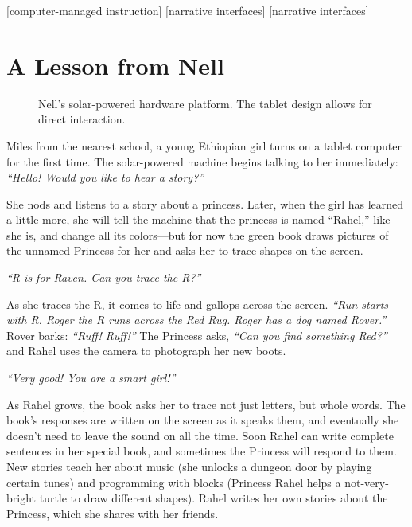 \documentclass{acm_proc_article-sp}
\begin{document}
[computer-managed instruction]
[narrative interfaces]
[narrative interfaces]


\section{A Lesson from Nell}
\begin{figure}
\centering
{}
\caption{Nell's solar-powered hardware platform.  The tablet design
  allows for direct interaction.}\label{fig:xo3}
\end{figure}
Miles from the nearest school, a young Ethiopian girl turns on a
tablet computer for the first time.  The solar-powered machine begins
talking to her immediately: \textit{``Hello!  Would you like to hear a story?''}

She nods and listens to a story about a princess.  Later, when
the girl has learned a little more, she will tell the machine that the
princess is named ``Rahel,'' like she is, and change all its
colors---but for now the green book draws pictures of the unnamed Princess
for her and asks her to trace shapes on the screen.

\textit{``R is for Raven.  Can you trace the R?''}

As she traces the R, it comes to life and gallops across the screen.
\textit{``Run starts with R.  Roger the R runs across the Red Rug.  Roger has a
dog named Rover.''}  Rover barks: \textit{``Ruff! Ruff!''}  The Princess asks,
\textit{``Can you find something Red?''} and Rahel uses the camera to
photograph her new boots.

\textit{``Very good!  You are a smart girl!''}

As Rahel grows, the book asks her to trace not just letters, but whole
words.  The book's responses are written on the screen as it speaks
them, and eventually she doesn't need to leave the sound on all the
time.  Soon Rahel can write complete sentences in her special book,
and sometimes the Princess will respond to them.  New stories teach her about
music (she unlocks a dungeon door by playing certain tunes) and
programming with blocks (Princess Rahel helps a not-very-bright turtle
to draw different shapes).  Rahel writes her own stories about the Princess,
which she shares with her friends.
\end{document}

